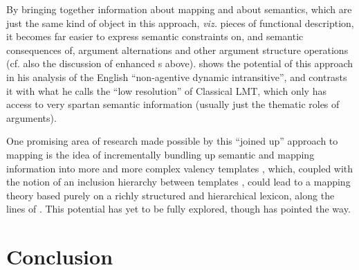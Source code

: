\documentclass[output=paper]{langscibook}
\begin{document}
By bringing together information about mapping and about semantics, which are
just the same kind of object in this approach, \textit{viz.} pieces of
functional description, it becomes far easier to express semantic constraints
on, and semantic consequences of, argument alternations and other argument
structure operations (cf. also the discussion of  enhanced
\astruc{}s above). \citet[32--39]{asudeh:unrealized} shows the potential of this
approach in his analysis of the English ``non-agentive dynamic intransitive'',
and contrasts it with what he calls the ``low resolution'' of Classical LMT,
which only has access to very spartan semantic information (usually just the
thematic roles of arguments).


One promising area of research made possible by this ``joined up'' approach to
mapping is the idea of incrementally bundling up semantic and mapping
information into more and more complex valency templates \citep[as employed in
e.g. ][]{AsudGior12,asudeh2014meaning,Findlay2020}, which, coupled with the
notion of an inclusion hierarchy between templates \citep[see
especially][17--20]{asudeh2013constructions}, could lead to a mapping theory
based purely on a richly structured and hierarchical lexicon, along the lines of
\citet{davisKoenig2000}. This potential has yet to be fully explored, though
\citet{przep2017hierarchical} has pointed the way.

\section{Conclusion}
\label{sec:argstr:conclusion}
\end{document}

